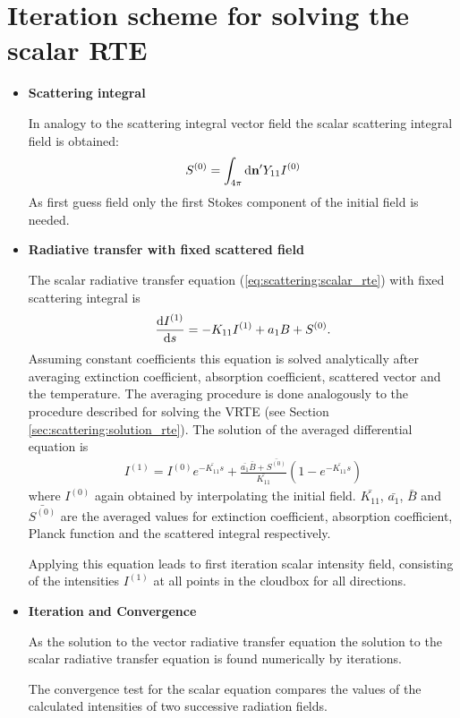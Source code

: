 \section{Iteration scheme for solving the scalar RTE}
\label{sec:scattering:solution_rte_scalar}
\begin{itemize}
\item {\bf Scattering integral}
  
  In analogy to the scattering integral vector field the scalar
  scattering integral field is obtained:
\begin{eqnarray}
  S^{(0)}  = \int_{4\pi} \mathrm{d} {\bf n}^\prime Y_{11} I^{(0)} 
\end{eqnarray}
As first guess field only the first Stokes component of the initial
field is needed.

\item{\bf Radiative transfer with fixed scattered field}
  
  The scalar radiative transfer equation
  (\ref{eq:scattering:scalar_rte}) with fixed scattering integral is
\begin{eqnarray}
  \label{eq:scattering:scalar_rte_scatint}
\frac{\mathrm{d} I^{(1)}}{\mathrm{d} s} = -K_{11} I^{(1)}
 + a_1 B + S^{(0)}.
\end{eqnarray} 
Assuming constant coefficients this equation is solved analytically
after averaging extinction coefficient, absorption coefficient,
scattered vector and the temperature. The averaging procedure is done
analogously to the procedure described for solving the VRTE (see
Section \ref{sec:scattering:solution_rte}).  The solution of the
averaged differential equation is
\begin{eqnarray}
   \label{eq:scattering:scalar_rte_sol}
I^{(1)} = I^{(0)} e^{-\bar{K_{11}}s} + \frac{\bar{a_1}
  \bar{B} + \bar{S^{(0)}}}{\bar{K_{11}}}\left(1-e^{-\bar{K_{11}}s}\right)
\end{eqnarray}
where $I^{(0)}$ again obtained by interpolating the initial field.
$\bar{K_{11}}$, $\bar{a_1}$, $\bar{B}$ and $\bar{S^{(0)}}$ are the
averaged values for extinction coefficient, absorption coefficient,
Planck function and the scattered integral respectively.

Applying this equation leads to first iteration scalar intensity
field, consisting of the intensities $I^{(1)}$ at all points in the
cloudbox for all directions.

\item{\bf Iteration and Convergence}
  
  As the solution to the vector radiative transfer equation the
  solution to the scalar radiative transfer equation is found
  numerically by iterations.
  
  The convergence test for the scalar equation compares the values of
  the calculated intensities of two successive radiation fields.

\end{itemize}


